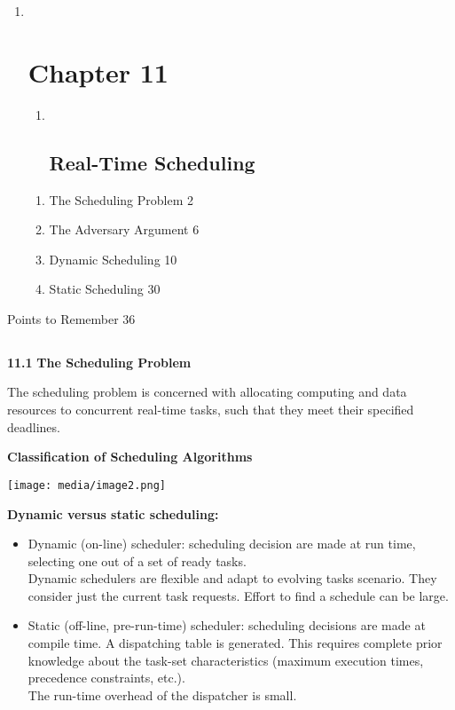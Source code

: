 \begin{enumerate}
\item ~
  \section{Chapter 11}\label{chapter-11}

  \begin{enumerate}
  \item ~
    \subsection{Real-Time Scheduling}\label{real-time-scheduling}
  \end{enumerate}

  \begin{enumerate}
  \def\labelenumii{\arabic{enumii}.}
  \item
    The Scheduling Problem 2
  \item
    The Adversary Argument 6
  \item
    Dynamic Scheduling 10
  \item
    Static Scheduling 30
  \end{enumerate}
\end{enumerate}

Points to Remember 36

\subsection{}\label{section}

\textbf{11.1} \protect\hypertarget{teil2}{}{}\textbf{The Scheduling
Problem}

The scheduling problem is concerned with allocating computing and data
resources to concurrent real-time tasks, such that they meet their
specified deadlines.

\textbf{Classification of Scheduling Algorithms}

\texttt{[image: media/image2.png]}

\textbf{Dynamic versus static scheduling:}

\begin{itemize}
\item
  Dynamic (on-line) scheduler: scheduling decision are made at run time,
  selecting one out of a set of ready tasks.\\
  Dynamic schedulers are flexible and adapt to evolving tasks scenario.
  They consider just the current task requests. Effort to find a
  schedule can be large.
\item
  Static (off-line, pre-run-time) scheduler: scheduling decisions are
  made at compile time. A dispatching table is generated. This requires
  complete prior knowledge about the task-set characteristics (maximum
  execution times, precedence constraints, etc.).\\
  The run-time overhead of the dispatcher is small.
\end{itemize}

